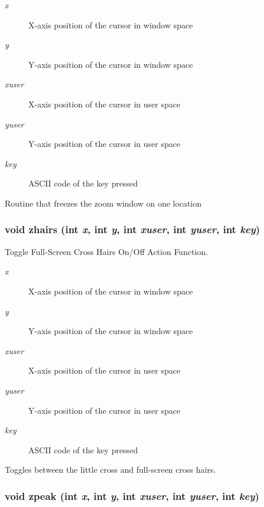 \begin{Desc}
\item[Parameters:]
\begin{description}
\item[{\em x}]X-axis position of the cursor in window space \item[{\em y}]Y-axis position of the cursor in window space \item[{\em xuser}]X-axis position of the cursor in user space \item[{\em yuser}]Y-axis position of the cursor in user space \item[{\em key}]ASCII code of the key pressed\end{description}
\end{Desc}
Routine that freezes the zoom window on one location 
\subsubsection{\setlength{\rightskip}{0pt plus 5cm}void zhairs (int {\em x}, int {\em y}, int {\em xuser}, int {\em yuser}, int {\em key})}\label{xtv_8h_a113}


Toggle Full-Screen Cross Hairs On/Off Action Function. 

\begin{Desc}
\item[Parameters:]
\begin{description}
\item[{\em x}]X-axis position of the cursor in window space \item[{\em y}]Y-axis position of the cursor in window space \item[{\em xuser}]X-axis position of the cursor in user space \item[{\em yuser}]Y-axis position of the cursor in user space \item[{\em key}]ASCII code of the key pressed\end{description}
\end{Desc}
Toggles between the little cross and full-screen cross hairs. 
\subsubsection{\setlength{\rightskip}{0pt plus 5cm}void zpeak (int {\em x}, int {\em y}, int {\em xuser}, int {\em yuser}, int {\em key})}\label{xtv_8h_a112}


